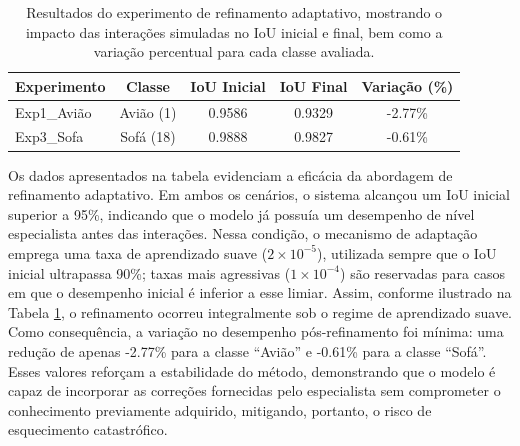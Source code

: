 

\begin{table}[h!]
\centering
\caption{Resultados do experimento de refinamento adaptativo, mostrando o impacto das interações simuladas no \ac{IoU} inicial e final, bem como a variação percentual para cada classe avaliada.}
\label{tab:exp1_results}
\begin{tabular}{|l|c|c|c|c|}
\hline
\textbf{Experimento} & \textbf{Classe} & \textbf{\ac{IoU} Inicial} & \textbf{\ac{IoU} Final} & \textbf{Variação (\%)} \\
\hline
Exp1\_Avião & Avião (1) & 0.9586 & 0.9329 & -2.77\% \\
Exp3\_Sofa & Sofá (18) & 0.9888 & 0.9827 & -0.61\% \\
\hline
\end{tabular}
\end{table}


Os dados apresentados na tabela evidenciam a eficácia da abordagem de refinamento adaptativo. Em ambos os cenários, o sistema alcançou um \ac{IoU} inicial superior a 95\%, indicando que o modelo já possuía um desempenho de nível especialista antes das interações. Nessa condição, o mecanismo de adaptação emprega uma taxa de aprendizado suave ($2 \times 10^{-5}$), utilizada sempre que o \ac{IoU} inicial ultrapassa 90\%; taxas mais agressivas ($1 \times 10^{-4}$) são reservadas para casos em que o desempenho inicial é inferior a esse limiar. Assim, conforme ilustrado na Tabela \ref{tab:exp1_results}, o refinamento ocorreu integralmente sob o regime de aprendizado suave.
Como consequência, a variação no desempenho pós-refinamento foi mínima: uma redução de apenas -2.77\% para a classe ``Avião'' e -0.61\% para a classe ``Sofá''. Esses valores reforçam a estabilidade do método, demonstrando que o modelo é capaz de incorporar as correções fornecidas pelo especialista sem comprometer o conhecimento previamente adquirido, mitigando, portanto, o risco de esquecimento catastrófico.


